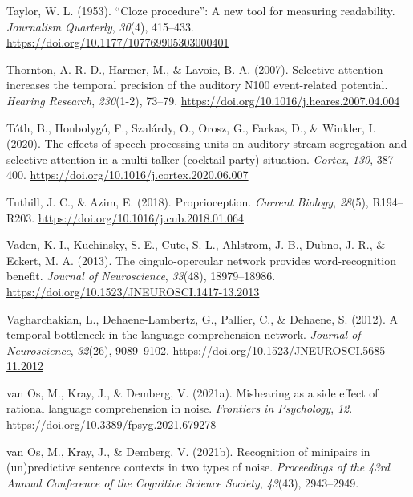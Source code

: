 \documentclass[a4paper, nobind]{templates/ociamthesis}
\newlength{\cslhangindent}
\newenvironment{CSLReferences}[2] %
 {%
  \setlength{\parindent}{0pt}
  \ifodd #1
  \let\oldpar\par
  \def\par{\hangindent=\cslhangindent\oldpar}
  \fi
  \setlength{\parskip}{1mm}
  \setlength{\baselineskip}{6mm}
 }%
 {}
\begin{document}
\begin{CSLReferences}{1}{0}
\leavevmode{}%
Taylor, W. L. (1953). {``Cloze procedure''}: A new tool for measuring readability. \emph{Journalism Quarterly}, \emph{30}(4), 415--433. \url{https://doi.org/10.1177/107769905303000401}

\leavevmode{}%
Thornton, A. R. D., Harmer, M., \& Lavoie, B. A. (2007). {Selective attention increases the temporal precision of the auditory N100 event-related potential}. \emph{Hearing Research}, \emph{230}(1-2), 73--79. \url{https://doi.org/10.1016/j.heares.2007.04.004}

\leavevmode{}%
Tóth, B., Honbolygó, F., Szalárdy, O., Orosz, G., Farkas, D., \& Winkler, I. (2020). {The effects of speech processing units on auditory stream segregation and selective attention in a multi-talker (cocktail party) situation}. \emph{Cortex}, \emph{130}, 387--400. \url{https://doi.org/10.1016/j.cortex.2020.06.007}

\leavevmode{}%
Tuthill, J. C., \& Azim, E. (2018). Proprioception. \emph{Current Biology}, \emph{28}(5), R194--R203. \url{https://doi.org/10.1016/j.cub.2018.01.064}

\leavevmode{}%
Vaden, K. I., Kuchinsky, S. E., Cute, S. L., Ahlstrom, J. B., Dubno, J. R., \& Eckert, M. A. (2013). {The cingulo-opercular network provides word-recognition benefit}. \emph{Journal of Neuroscience}, \emph{33}(48), 18979--18986. \url{https://doi.org/10.1523/JNEUROSCI.1417-13.2013}

\leavevmode{}%
Vagharchakian, L., Dehaene-Lambertz, G., Pallier, C., \& Dehaene, S. (2012). {A temporal bottleneck in the language comprehension network}. \emph{Journal of Neuroscience}, \emph{32}(26), 9089--9102. \url{https://doi.org/10.1523/JNEUROSCI.5685-11.2012}

\leavevmode{}%
van Os, M., Kray, J., \& Demberg, V. (2021a). Mishearing as a side effect of rational language comprehension in noise. \emph{Frontiers in Psychology}, \emph{12}. \url{https://doi.org/10.3389/fpsyg.2021.679278}

\leavevmode{}%
van Os, M., Kray, J., \& Demberg, V. (2021b). {Recognition of minipairs in (un)predictive sentence contexts in two types of noise}. \emph{Proceedings of the 43rd Annual Conference of the Cognitive Science Society}, \emph{43}(43), 2943--2949.


\end{CSLReferences}
\end{document}
